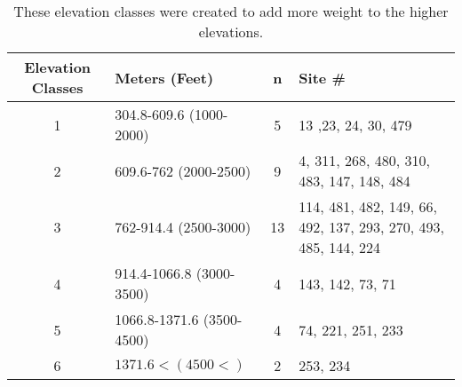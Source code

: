 \begin{table}[h]
\caption[Proposed elevation classes]{These elevation classes were created to add more weight to the higher elevations.}
\begin{tabular}{clcp{5cm}}
\toprule
Elevation Classes & Meters (Feet)                              & n & Site \# \\ 
\midrule
1                        & 304.8-609.6 (1000-2000)           & 5   & 13 ,23, 24, 30, 479 \\ 
2                        & 609.6-762 (2000-2500)              & 9   & 4, 311, 268, 480, 310, 483, 147, 148, 484 \\ 
3                        & 762-914.4 (2500-3000)              & 13 & 114, 481, 482, 149, 66, 492, 137, 293, 270, 493, 485, 144, 224 \\ 
4                        & 914.4-1066.8 (3000-3500)         & 4   & 143, 142, 73, 71 \\ 
5                        & 1066.8-1371.6 (3500-4500)       & 4   & 74, 221, 251, 233 \\ 
6                        & $1371.6< (4500<)$                    & 2   & 253, 234 \\ 
\bottomrule
\end{tabular}
\label{tab:ElevationBands}
\end{table}
